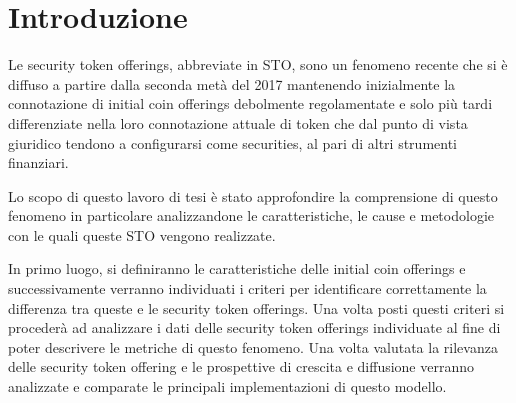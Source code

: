 \chapter*{Introduzione}                 %
Le security token offerings, abbreviate in STO, sono un fenomeno recente che si è diffuso a partire dalla seconda metà del 2017 mantenendo inizialmente la connotazione di initial coin offerings debolmente regolamentate e solo più tardi differenziate nella loro connotazione attuale di token che dal punto di vista giuridico tendono a configurarsi come securities, al pari di altri strumenti finanziari.  

Lo scopo di questo lavoro di tesi è stato approfondire la comprensione di questo fenomeno in particolare analizzandone le caratteristiche, le cause e metodologie con le quali queste STO vengono realizzate.

In primo luogo, si definiranno le caratteristiche delle initial coin offerings e successivamente verranno individuati i criteri per identificare correttamente la differenza tra queste e le security token offerings. Una volta posti questi criteri si procederà ad analizzare i dati delle security token offerings individuate al fine di poter descrivere le metriche di questo fenomeno. Una volta valutata la rilevanza delle security token offering e le prospettive di crescita e diffusione verranno analizzate e comparate le principali implementazioni di questo modello.  



\clearpage{\pagestyle{empty}\cleardoublepage}